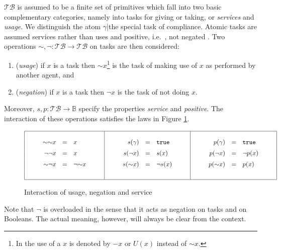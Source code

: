 \documentclass{pseudoelsart}
\newcommand{\tr}{{\mathtt{true}}}
\newcommand{\geb}{{\sim}}
\begin{document}
$\mathcal{TB}$ is assumed to be a finite set of primitives which fall into two
basic complementary
categories, namely into tasks for giving or taking, or \emph{services} and \emph{usage}.
We distinguish the atom $\gamma$|the special task of compliance.
Atomic tasks are assumed services rather than uses and positive, i.e.\ , not 
negated . Two operations $\geb  , \neg : \mathcal{TB} \rightarrow \mathcal{TB}$ on 
tasks
are then considered:
\begin{enumerate}
\item (\emph{usage}) if $x$ is a task then $\geb  x$\footnote{In \cite{B06,BF06}
the use of a $x$ is denoted by $-x$ or $U(x)$ instead of $\geb x$.} is the task of making use of $x$ as performed by
another agent, and
\item (\emph{negation}) if $x$ is a task then $\neg x$ is the task of not doing $x$.
\end{enumerate}
Moreover, $s, p: \mathcal{TB} \rightarrow \mathbb{B}$ specify the properties \emph{service} and 
\emph{positive}.
The interaction of these operations satisfies the laws in Figure \ref{usage_negation}.
\begin{figure}[htbp]
\[
\begin{array}{|crclc|crclc|crclc|}
\hline
&&&&&&&&&&&&&&\\
\hspace{0.5cm}&\geb  \geb  x & = & x&\hspace{0.5cm}&\hspace{0.5cm}&
s(\gamma) 
& = & \tr&\hspace{0.5cm}&\hspace{0.5cm}&p(\gamma)&= &\tr&\\[2mm]
&\neg \neg x & = & x&&&s(\neg x) & =& s(x)&&& p(\neg x)&=& \neg p(x)&\\[2mm]
&\geb  \neg x & = & \neg \geb   x&&&s(\geb x)&=& \neg s(x)&&&p(\geb x)&=& p(x)&\\[2mm]
\hspace{.5cm}&&&&&&&&&&&&&&\hspace{.5cm}\\
\hline
\end{array}
\]
\caption{Interaction of usage, negation and service \label{usage_negation}}
\end{figure}
Note that $\neg$ is overloaded in the sense that it acts as negation on tasks and
on Booleans. The actual meaning, however, will always be clear from the context.
\end{document}
